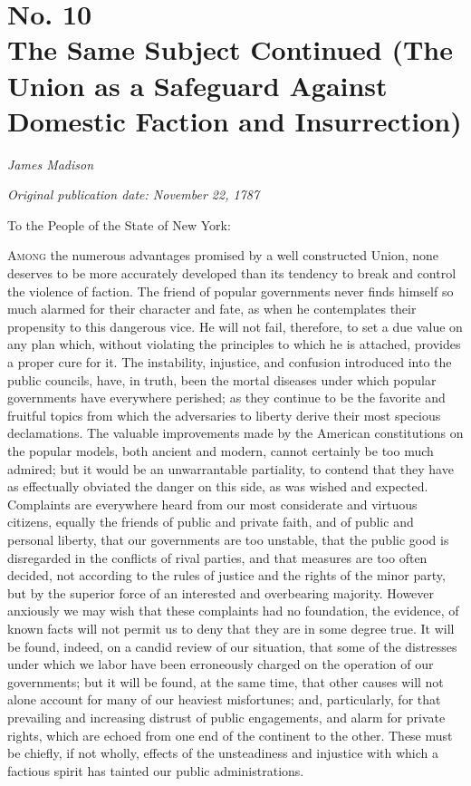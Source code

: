 \chapter[No. 10: The Same Subject Continued (The Union as a Safeguard Against Domestic Faction and Insurrection)]{No. 10\\ {\small The Same Subject Continued (The Union as a Safeguard Against Domestic Faction and Insurrection)}}

\textit{James Madison}

\textit{Original publication date: November 22, 1787}
\vspace{1cm}

To the People of the State of New York:
\vspace{.4cm}

\textsc{Among} the numerous advantages promised by a well constructed Union, none deserves to be more accurately developed than its tendency to break and control the violence of faction. 
The friend of popular governments never finds himself so much alarmed for their character and fate, as when he contemplates their propensity to this dangerous vice. 
He will not fail, therefore, to set a due value on any plan which, without violating the principles to which he is attached, provides a proper cure for it. 
The instability, injustice, and confusion introduced into the public councils, have, in truth, been the mortal diseases under which popular governments have everywhere perished; as they continue to be the favorite and fruitful topics from which the adversaries to liberty derive their most specious declamations. 
The valuable improvements made by the American constitutions on the popular models, both ancient and modern, cannot certainly be too much admired; but it would be an unwarrantable partiality, to contend that they have as effectually obviated the danger on this side, as was wished and expected. 
Complaints are everywhere heard from our most considerate and virtuous citizens, equally the friends of public and private faith, and of public and personal liberty, that our governments are too unstable, that the public good is disregarded in the conflicts of rival parties, and that measures are too often decided, not according to the rules of justice and the rights of the minor party, but by the superior force of an interested and overbearing majority. 
However anxiously we may wish that these complaints had no foundation, the evidence, of known facts will not permit us to deny that they are in some degree true. 
It will be found, indeed, on a candid review of our situation, that some of the distresses under which we labor have been erroneously charged on the operation of our governments; but it will be found, at the same time, that other causes will not alone account for many of our heaviest misfortunes; and, particularly, for that prevailing and increasing distrust of public engagements, and alarm for private rights, which are echoed from one end of the continent to the other. 
These must be chiefly, if not wholly, effects of the unsteadiness and injustice with which a factious spirit has tainted our public administrations.

